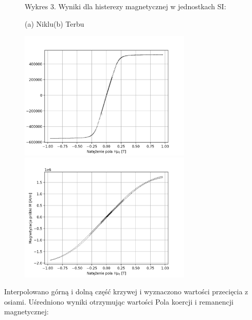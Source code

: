 \documentclass[a4paper]{article}
\begin{document}
\begin{figure}[H]
    \centering
    Wykres 3. Wyniki dla histerezy magnetycznej w jednostkach SI:
    \vspace{0.6cm}
    
    (a) Niklu\hspace{7cm}(b) Terbu
    
    \includegraphics[width=8.2cm]{Ni_SI.png}
    \includegraphics[width=8.2cm]{Tb_SI.png}
    \label{fig:my_label}
\end{figure}



Interpolowano górną i dolną część krzywej i wyznaczono wartości przecięcia z osiami. Uśredniono wyniki otrzymując wartości Pola koercji i remanencji magnetycznej:
\end{document}
